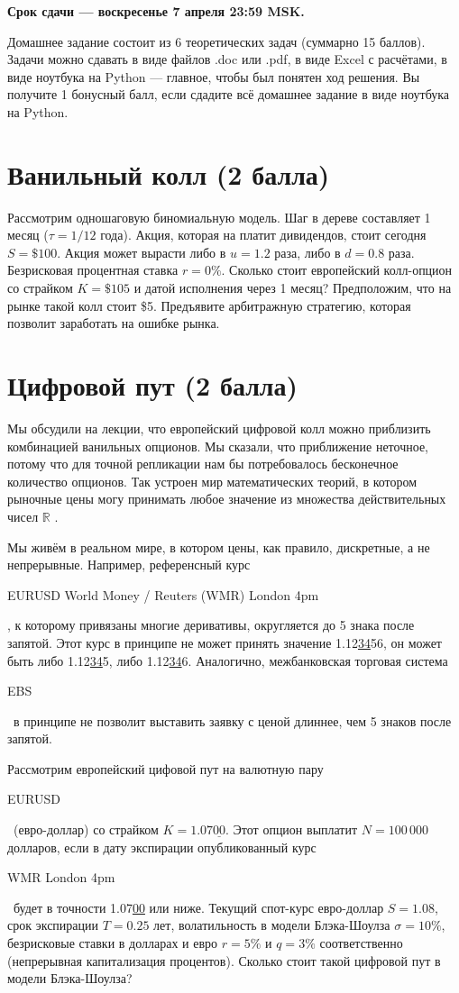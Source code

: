 \documentclass[a4paper,14pt]{extarticle}
\newcommand{\en}[1]{\begin{otherlanguage}{english}#1\end{otherlanguage}}
\begin{document}
\noindent \textbf{Срок сдачи --- воскресенье 7 апреля 23:59 MSK.}

\vspace{\baselineskip}

\noindent Домашнее задание состоит из 6 теоретических задач (суммарно 15 баллов). Задачи 
можно сдавать в виде файлов .doc или .pdf, в виде Excel с расчётами, в виде ноутбука на Python --- главное, чтобы был понятен ход решения. Вы получите 1 бонусный балл, если сдадите всё домашнее задание в виде ноутбука на Python.

\section{Ванильный колл (2 балла)}

Рассмотрим одношаговую биномиальную модель. Шаг в дереве составляет 1 месяц ($\tau=1/12$
года). Акция, которая на платит дивидендов, стоит сегодня $S=\$100$. Акция
может вырасти либо в $u=1.2$ раза, либо в $d=0.8$ раза. Безрисковая процентная ставка $r=0\%$. 
Сколько стоит европейский колл-опцион со страйком $K=\$105$ и датой исполнения через 1 месяц?
Предположим, что на рынке такой колл стоит \$5. Предъявите арбитражную стратегию, которая
позволит заработать на ошибке рынка.

\section{Цифровой пут (2 балла)}

Мы обсудили на лекции, что европейский цифровой колл можно приблизить комбинацией ванильных опционов. Мы сказали, что приближение неточное, потому что для точной репликации нам бы потребовалось бесконечное количество опционов. Так устроен мир математических теорий, в котором рыночные цены могу принимать любое значение из множества действительных чисел $\mathbb{R}$ .

Мы живём в реальном мире, в котором цены, как правило, дискретные, а не непрерывные. Например, референсный курс \en{EURUSD World Money / Reuters (WMR) London 4pm}, к которому привязаны многие деривативы, округляется до 5 знака после запятой. Этот курс в принципе не может принять значение 1.12\underline{34}56, он может быть либо 1.12\underline{34}5, либо 1.12\underline{34}6. Аналогично, межбанковская торговая система \en{EBS}\ в принципе не позволит выставить заявку с ценой длиннее, чем 5 знаков после запятой.

Рассмотрим европейский цифовой пут на валютную пару \en{EURUSD}\ (евро-доллар) со страйком $K=1.07\underline{00}$. Этот опцион выплатит $N=100\,000$ долларов, если в дату экспирации опубликованный курс \en{WMR London 4pm}\ будет в точности 1.07\underline{00} или ниже. Текущий спот-курс евро-доллар $S=1.08$, срок экспирации $T=0.25$ лет, волатильность в модели Блэка-Шоулза $\sigma=10\%$, безрисковые ставки в долларах и евро $r=5\%$ и $q=3\%$ соответственно (непрерывная капитализация процентов). Сколько стоит такой цифровой пут в модели Блэка-Шоулза?
\end{document}
